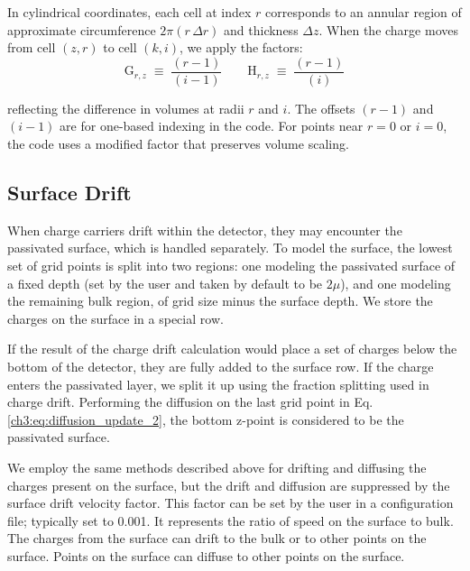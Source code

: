 In cylindrical coordinates, each cell at index $r$ corresponds to an annular region of approximate circumference $2\pi (r \,\Delta r)$ and thickness $\Delta z$. When the charge moves from cell $(z,r)$ to cell $(k,i)$, we apply the factors:
\[
\text{G}_{r,z} \;\equiv\; \frac{(r-1)}{(i-1)}
\qquad
\text{H}_{r,z} \;\equiv\; \frac{(r-1)}{(i)}
\] 

\noindent
reflecting the difference in volumes at radii $r$ and $i$.
The offsets $(r-1)$ and $(i-1)$ are for one-based indexing in the code. For points near $r=0$ or $i=0$, the code uses a modified factor that preserves volume scaling. 


\subsection{Surface Drift}

When charge carriers drift within the detector, they may encounter the passivated surface, which is handled separately. To model the surface, the lowest set of grid points is split into two regions: one modeling the passivated surface of a fixed depth (set by the user and taken by default to be $2\mu$), and one modeling the remaining bulk region, of grid size minus the surface depth. We store the charges on the surface in a special row. 

If the result of the charge drift calculation would place a set of charges below the bottom of the detector, they are fully added to the surface row. If the charge enters the passivated layer, we split it up using the fraction splitting used in charge drift. Performing the diffusion on the last grid point in Eq. \ref{ch3:eq:diffusion_update_2}, the bottom z-point is considered to be the passivated surface. 


We employ the same methods described above for drifting and diffusing the charges present on the surface, but the drift and diffusion are suppressed by the surface drift velocity factor. This factor can be set by the user in a configuration file; typically set to 0.001. It represents the ratio of speed on the surface to bulk. The charges from the surface can drift to the bulk or to other points on the surface. Points on the surface can diffuse to other points on the surface.

